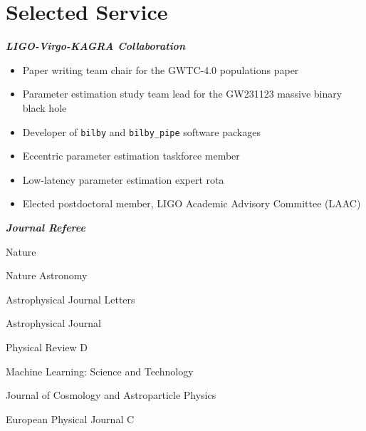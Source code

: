 			\section{Selected Service}
			\textit{\textbf{LIGO-Virgo-KAGRA Collaboration}}
			\begin{itemize}[leftmargin=*]
            \item{Paper writing team chair for the GWTC-4.0 populations paper}
            \item{Parameter estimation study team lead for the GW231123 massive binary black hole}
            \item{Developer of \texttt{bilby} and \texttt{bilby\_pipe} software packages}
			\item{Eccentric parameter estimation taskforce member}
			\item{Low-latency parameter estimation expert rota}
			\item{Elected postdoctoral member, LIGO Academic Advisory Committee (LAAC)}
        	\end{itemize}
        	\textit{\textbf{Journal Referee}}\\
        	\begin{itemize*}[leftmargin=*]
        		\item Nature
                \item Nature Astronomy
        		\item Astrophysical Journal Letters
        		\item Astrophysical Journal
        		\item Physical Review D
        		\item Machine Learning: Science and Technology
        		\item Journal of Cosmology and Astroparticle Physics
        		\item European Physical Journal C
        	\end{itemize*}


		
